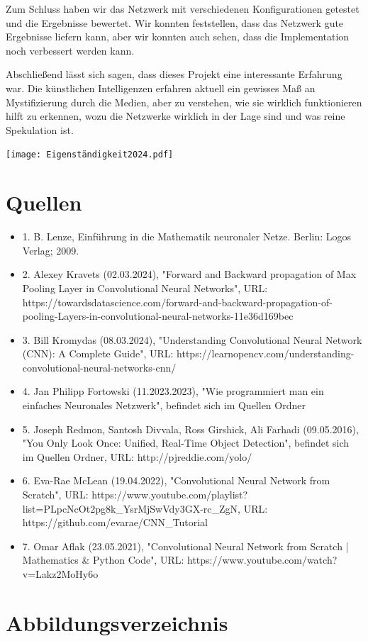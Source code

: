 \documentclass[12pt]{article}
\begin{document}
Zum Schluss haben wir das Netzwerk mit verschiedenen Konfigurationen getestet und die Ergebnisse bewertet. Wir konnten feststellen, dass das Netzwerk gute Ergebnisse liefern kann, aber wir konnten auch sehen, dass die Implementation noch verbessert werden kann.

Abschließend lässt sich sagen, dass dieses Projekt eine interessante Erfahrung war. Die künstlichen Intelligenzen erfahren aktuell ein gewisses Maß an Mystifizierung durch die Medien, aber zu verstehen, wie sie wirklich funktionieren hilft zu erkennen, wozu die Netzwerke wirklich in der Lage sind und was reine Spekulation ist.

\texttt{[image: Eigenständigkeit2024.pdf]}
\thispagestyle{empty}

\sloppy
\section{Quellen}
\begin{itemize}
\item 1. B. Lenze, Einführung in die Mathematik neuronaler Netze. Berlin: Logos Verlag; 2009.
\item 2. Alexey Kravets (02.03.2024), "Forward and Backward propagation of Max Pooling Layer in Convolutional Neural Networks", URL: https://towardsdatascience.com/forward-and-backward-propagation-of-pooling-Layers-in-convolutional-neural-networks-11e36d169bec
\item 3. Bill Kromydas (08.03.2024), "Understanding Convolutional Neural Network (CNN): A Complete Guide", URL: https://learnopencv.com/understanding-convolutional-neural-networks-cnn/
\item 4. Jan Philipp Fortowski (11.2023.2023), "Wie programmiert man ein einfaches Neuronales Netzwerk", befindet sich im Quellen Ordner
\item 5. Joseph Redmon, Santosh Divvala, Ross Girshick, Ali Farhadi (09.05.2016), "You Only Look Once:
Unified, Real-Time Object Detection", befindet sich im Quellen Ordner, URL: http://pjreddie.com/yolo/
\item 6. Eva-Rae McLean (19.04.2022), "Convolutional Neural Network from Scratch", URL: https://www.youtube.com/playlist?list=PLpcNcOt2pg8k\_YsrMjSwVdy3GX-rc\_ZgN, URL: https://github.com/evarae/CNN\_Tutorial
\item 7. Omar Aflak (23.05.2021), "Convolutional Neural Network from Scratch | Mathematics \& Python Code", URL: https://www.youtube.com/watch?v=Lakz2MoHy6o


\end{itemize}

\cleardoublepage
\section{Abbildungsverzeichnis}
\listoffigures
\end{document}
